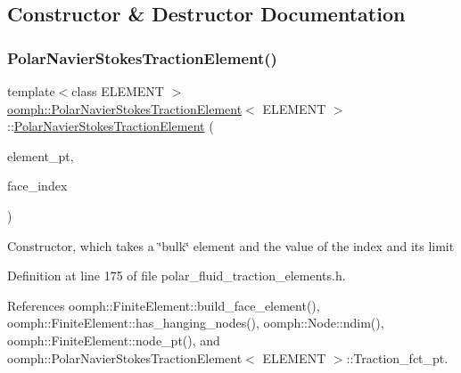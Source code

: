 \subsection{Constructor \& Destructor Documentation}
\mbox{\label{classoomph_1_1PolarNavierStokesTractionElement_a4149e7be21b5028eb684db0488177f66}} 
\subsubsection{\texorpdfstring{Polar\+Navier\+Stokes\+Traction\+Element()}{PolarNavierStokesTractionElement()}}
{\footnotesize\ttfamily template$<$class E\+L\+E\+M\+E\+NT $>$ \\
\hyperlink{classoomph_1_1PolarNavierStokesTractionElement}{oomph\+::\+Polar\+Navier\+Stokes\+Traction\+Element}$<$ E\+L\+E\+M\+E\+NT $>$\+::\hyperlink{classoomph_1_1PolarNavierStokesTractionElement}{Polar\+Navier\+Stokes\+Traction\+Element} (\begin{DoxyParamCaption}\item[{\hyperlink{classoomph_1_1FiniteElement}{Finite\+Element} $\ast$const \&}]{element\+\_\+pt,  }\item[{const int \&}]{face\+\_\+index }\end{DoxyParamCaption})\hspace{0.3cm}{\ttfamily [inline]}}

Constructor, which takes a \char`\"{}bulk\char`\"{} element and the value of the index and its limit 

Definition at line 175 of file polar\+\_\+fluid\+\_\+traction\+\_\+elements.\+h.



References oomph\+::\+Finite\+Element\+::build\+\_\+face\+\_\+element(), oomph\+::\+Finite\+Element\+::has\+\_\+hanging\+\_\+nodes(), oomph\+::\+Node\+::ndim(), oomph\+::\+Finite\+Element\+::node\+\_\+pt(), and oomph\+::\+Polar\+Navier\+Stokes\+Traction\+Element$<$ E\+L\+E\+M\+E\+N\+T $>$\+::\+Traction\+\_\+fct\+\_\+pt.

\mbox{\label{classoomph_1_1PolarNavierStokesTractionElement_a3ef9959b78ea2bea768f7c90ffae6e91}} 
